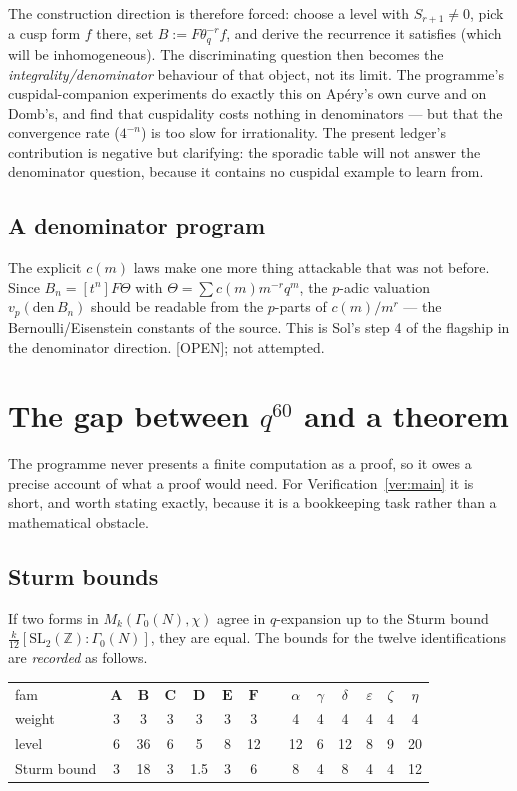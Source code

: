 \documentclass[11pt,reqno]{amsart}
\theoremstyle{plain}
\theoremstyle{definition}
\theoremstyle{remark}
\newcommand{\Z}{\mathbb{Z}}
\newcommand{\thq}{\theta_q}
\newcommand{\Open}{\textup{\textsf{[OPEN]}}}
\begin{document}
The construction direction is therefore forced: choose a level with
$S_{r+1}\neq0$, pick a cusp form $f$ there, set $B:=F\thq^{-r}f$, and derive
the recurrence it satisfies (which will be inhomogeneous). The
discriminating question then becomes the \emph{integrality/denominator}
behaviour of that object, not its limit. The programme's cuspidal-companion
experiments \cite{cusp} do exactly this on Ap\'ery's own curve and on
Domb's, and find that cuspidality costs nothing in denominators --- but
that the convergence rate ($4^{-n}$) is too slow for irrationality. The
present ledger's contribution is negative but clarifying: the sporadic
table will not answer the denominator question, because it contains no
cuspidal example to learn from.

\subsection{A denominator program}
The explicit $c(m)$ laws make one more thing attackable that was not
before. Since $B_n=[t^n]F\Theta$ with $\Theta=\sum c(m)m^{-r}q^m$, the
$p$-adic valuation $v_p(\text{den}\,B_n)$ should be readable from the
$p$-parts of $c(m)/m^{r}$ --- the Bernoulli/Eisenstein constants of the
source. This is Sol's step 4 of the flagship in the denominator direction.
\Open; not attempted.

\section{The gap between $q^{60}$ and a theorem}
\label{sec:gap}

The programme never presents a finite computation as a proof, so it owes a
precise account of what a proof would need. For Verification~\ref{ver:main}
it is short, and worth stating exactly, because it is a bookkeeping task
rather than a mathematical obstacle.

\subsection{Sturm bounds}
If two forms in $M_k(\Gamma_0(N),\chi)$ agree in $q$-expansion up to the
Sturm bound $\frac{k}{12}[\mathrm{SL}_2(\Z):\Gamma_0(N)]$, they are equal.
The bounds for the twelve identifications are \emph{recorded} as follows.

\begin{center}
\renewcommand{\arraystretch}{1.2}
\begin{tabular}{@{}l cccccc c cccccc@{}}
\toprule
fam & $\mathbf A$&$\mathbf B$&$\mathbf C$&$\mathbf D$&$\mathbf E$&$\mathbf F$
& & $\alpha$&$\gamma$&$\delta$&$\varepsilon$&$\zeta$&$\eta$\\
weight & 3&3&3&3&3&3 & & 4&4&4&4&4&4\\
level & 6&36&6&5&8&12 & & 12&6&12&8&9&20\\
Sturm bound & 3&18&3&1.5&3&6 & & 8&4&8&4&4&12\\
\bottomrule
\end{tabular}
\end{center}
\end{document}
